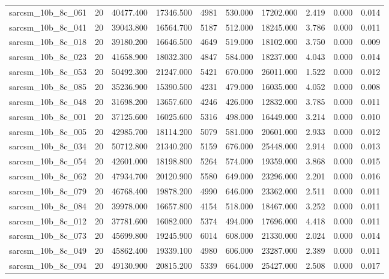 \begin{tabular}{lrrrrrrrrr}
sarcsm\_10b\_8c\_061 & 20 & 40477.400 & 17346.500 & 4981 & 530.000 & 17202.000 & 2.419 & 0.000 & 0.014 \\
sarcsm\_10b\_8c\_041 & 20 & 39043.800 & 16564.700 & 5187 & 512.000 & 18245.000 & 3.786 & 0.000 & 0.011 \\
sarcsm\_10b\_8c\_018 & 20 & 39180.200 & 16646.500 & 4649 & 519.000 & 18102.000 & 3.750 & 0.000 & 0.009 \\
sarcsm\_10b\_8c\_023 & 20 & 41658.900 & 18032.300 & 4847 & 584.000 & 18237.000 & 4.043 & 0.000 & 0.014 \\
sarcsm\_10b\_8c\_053 & 20 & 50492.300 & 21247.000 & 5421 & 670.000 & 26011.000 & 1.522 & 0.000 & 0.012 \\
sarcsm\_10b\_8c\_085 & 20 & 35236.900 & 15390.500 & 4231 & 479.000 & 16035.000 & 4.052 & 0.000 & 0.008 \\
sarcsm\_10b\_8c\_048 & 20 & 31698.200 & 13657.600 & 4246 & 426.000 & 12832.000 & 3.785 & 0.000 & 0.011 \\
sarcsm\_10b\_8c\_001 & 20 & 37125.600 & 16025.600 & 5316 & 498.000 & 16449.000 & 3.214 & 0.000 & 0.010 \\
sarcsm\_10b\_8c\_005 & 20 & 42985.700 & 18114.200 & 5079 & 581.000 & 20601.000 & 2.933 & 0.000 & 0.012 \\
sarcsm\_10b\_8c\_034 & 20 & 50712.800 & 21340.200 & 5159 & 676.000 & 25448.000 & 2.914 & 0.000 & 0.013 \\
sarcsm\_10b\_8c\_054 & 20 & 42601.000 & 18198.800 & 5264 & 574.000 & 19359.000 & 3.868 & 0.000 & 0.015 \\
sarcsm\_10b\_8c\_062 & 20 & 47934.700 & 20120.900 & 5580 & 649.000 & 23296.000 & 2.201 & 0.000 & 0.016 \\
sarcsm\_10b\_8c\_079 & 20 & 46768.400 & 19878.200 & 4990 & 646.000 & 23362.000 & 2.511 & 0.000 & 0.011 \\
sarcsm\_10b\_8c\_084 & 20 & 39978.000 & 16657.800 & 4154 & 518.000 & 18467.000 & 3.252 & 0.000 & 0.011 \\
sarcsm\_10b\_8c\_012 & 20 & 37781.600 & 16082.000 & 5374 & 494.000 & 17696.000 & 4.418 & 0.000 & 0.011 \\
sarcsm\_10b\_8c\_073 & 20 & 45699.800 & 19245.900 & 6014 & 608.000 & 21330.000 & 2.024 & 0.000 & 0.014 \\
sarcsm\_10b\_8c\_049 & 20 & 45862.400 & 19339.100 & 4980 & 606.000 & 23287.000 & 2.389 & 0.000 & 0.011 \\
sarcsm\_10b\_8c\_094 & 20 & 49130.900 & 20815.200 & 5339 & 664.000 & 25427.000 & 2.508 & 0.000 & 0.017 \\

\end{tabular}
